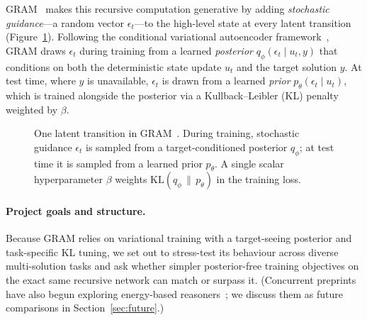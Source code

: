 \documentclass[11pt]{article}
\begin{document}
GRAM~\cite{baek2026} makes this recursive computation generative by adding \emph{stochastic guidance}---a random vector $\epsilon_t$---to the high-level state at every latent transition (Figure~\ref{fig:gram_arch}). Following the conditional variational autoencoder framework~\cite{sohn2015}, GRAM draws $\epsilon_t$ during training from a learned \emph{posterior} $q_\phi(\epsilon_t \mid u_t, y)$ that conditions on both the deterministic state update $u_t$ and the target solution $y$. At test time, where $y$ is unavailable, $\epsilon_t$ is drawn from a learned \emph{prior} $p_\theta(\epsilon_t \mid u_t)$, which is trained alongside the posterior via a Kullback--Leibler (KL) penalty weighted by $\beta$.

\begin{figure}[!ht]
  \centering
  \caption{One latent transition in GRAM~\cite{baek2026}. During training, stochastic guidance $\epsilon_t$ is sampled from a target-conditioned posterior $q_\phi$; at test time it is sampled from a learned prior $p_\theta$. A single scalar hyperparameter $\beta$ weights $\mathrm{KL}(q_\phi \,\|\, p_\theta)$ in the training loss.}
  \label{fig:gram_arch}
\end{figure}

\paragraph{Project goals and structure.}
Because GRAM relies on variational training with a target-seeing posterior and task-specific KL tuning, we set out to stress-test its behaviour across diverse multi-solution tasks and ask whether simpler posterior-free training objectives on the exact same recursive network can match or surpass it. (Concurrent preprints have also begun exploring energy-based reasoners~\cite{chen2026,hoover2026}; we discuss them as future comparisons in Section~\ref{sec:future}.)
\end{document}
